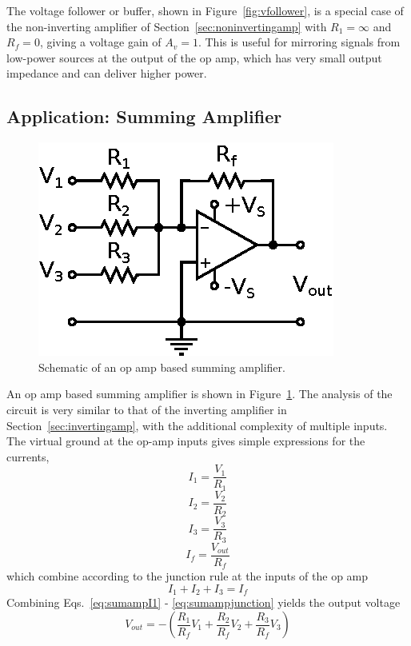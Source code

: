 \documentclass[11pt]{article}
\begin{document}
The voltage follower or buffer, shown in Figure~\ref{fig:vfollower},
is a special case of the non-inverting amplifier of
Section~\ref{sec:noninvertingamp} with $R_1 = \infty$ and $R_f = 0$,
giving a voltage gain of $A_v = 1$.  This is useful for mirroring
signals from low-power sources at the output of the op amp, which has
very small output impedance and can deliver higher power.

\subsection{Application: Summing Amplifier}
\label{sec:summingamp}

\begin{figure}[h!]
  \begin{center}
    \includegraphics{summingamp.eps}
    \caption{Schematic of an op amp based summing amplifier.}
    \label{fig:summingamp}
  \end{center}
\end{figure}

An op amp based summing amplifier is shown in
Figure~\ref{fig:summingamp}. The analysis of the circuit is very
similar to that of the inverting amplifier in
Section~\ref{sec:invertingamp}, with the additional complexity of
multiple inputs. The virtual ground at the op-amp inputs gives simple
expressions for the currents,
\begin{equation}
  \label{eq:sumampI1}
  I_1 = \frac{V_1}{R_1}
\end{equation}
\begin{equation}
  I_2 = \frac{V_2}{R_2}
\end{equation}
\begin{equation}
  I_3 = \frac{V_3}{R_3}
\end{equation}
\begin{equation}
  I_f = \frac{V_{out}}{R_f}
\end{equation}
which combine according to the junction rule at the inputs of the op
amp
\begin{equation}
  \label{eq:sumampjunction}
  I_1 + I_2 + I_3 = I_f
\end{equation}
Combining Eqs.~\ref{eq:sumampI1} - \ref{eq:sumampjunction} yields the
output voltage
\begin{equation}
  \label{eq:summingampvout}
  V_{out} = -\left( \frac{R_1}{R_f} V_1 + \frac{R_2}{R_f} V_2 +
  \frac{R_3}{R_f} V_3 \right)
\end{equation}
\end{document}
